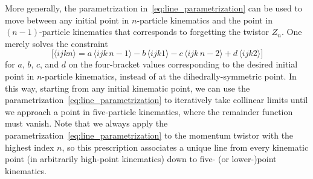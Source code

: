 \documentclass[11pt]{article}
\begin{document}
More generally, the parametrization in~\eqref{eq:line_parametrization} can be used to move between any initial point in $n$-particle kinematics and the point in $(n{-}1)$-particle kinematics that corresponds to forgetting the twistor $Z_n$. One merely solves the constraint
\begin{equation}
\Big[ \langle i j k n \rangle = a\, \langle i j k \, n{-}1 \rangle - b\, \langle i  j  k 1 \rangle - c\, \langle i j k \, n{-}2 \rangle + d\, \langle i j k 2 \rangle \Big] 
\end{equation}
for $a$, $b$, $c$, and $d$ on the four-bracket values corresponding to the desired initial point in $n$-particle kinematics, instead of at the dihedrally-symmetric point. In this way, starting from any initial kinematic point, we can use the parametrization~\eqref{eq:line_parametrization} to iteratively take collinear limits until we approach a point in five-particle kinematics, where the remainder function must vanish. Note that we always apply the parametrization~\eqref{eq:line_parametrization} to the momentum twistor with the highest index $n$, so this prescription associates a unique line from every kinematic point (in arbitrarily high-point kinematics) down to five- (or lower-)point kinematics.
\end{document}
